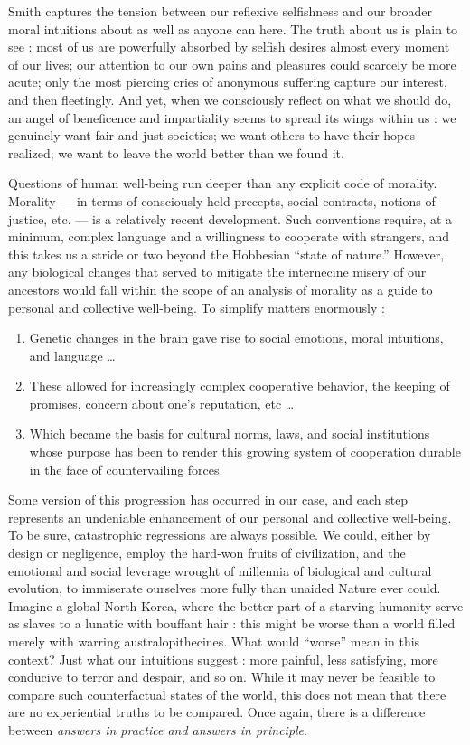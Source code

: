 \documentclass[a4paper,14pt]{extbook}
\begin{document}
Smith captures the tension between our reflexive selfishness and our broader moral intuitions about as well as anyone can here.
The truth about us is plain to see :
most of us are powerfully absorbed by selfish desires almost every moment of our lives;
our attention to our own pains and pleasures could scarcely be more acute;
only the most piercing cries of anonymous suffering capture our interest, and then fleetingly.
And yet, when we consciously reflect on what we should do, an angel of beneficence and impartiality seems to spread its wings within us :
we genuinely want fair and just societies;
we want others to have their hopes realized;
we want to leave the world better than we found it.

Questions of human well-being run deeper than any explicit code of morality.
Morality --- in terms of consciously held precepts, social contracts, notions of justice, etc. --- is a relatively recent development.
Such conventions require, at a minimum, complex language and a willingness to cooperate with strangers, and this takes us a stride or two beyond the Hobbesian ``state of nature.''
However, any biological changes that served to mitigate the internecine misery of our ancestors would fall within the scope of an analysis of morality as a guide to personal and collective well-being.
To simplify matters enormously :

\begin{enumerate}
      \item Genetic changes in the brain gave rise to social emotions, moral intuitions, and language \dots
      \item These allowed for increasingly complex cooperative behavior, the keeping of promises, concern about one's reputation, etc \dots
      \item Which became the basis for cultural norms, laws, and social institutions whose purpose has been to render this growing system of cooperation durable in the face of countervailing forces.
\end{enumerate}

Some version of this progression has occurred in our case, and each step represents an undeniable enhancement of our personal and collective well-being.
To be sure, catastrophic regressions are always possible.
We could, either by design or negligence, employ the hard-won fruits of civilization, and the emotional and social leverage wrought of millennia of biological and cultural evolution, to immiserate ourselves more fully than unaided Nature ever could.
Imagine a global North Korea, where the better part of a starving humanity serve as slaves to a lunatic with bouffant hair :
this might be worse than a world filled merely with warring australopithecines.
What would ``worse'' mean in this context?
Just what our intuitions suggest :
more painful, less satisfying, more conducive to terror and despair, and so on.
While it may never be feasible to compare such counterfactual states of the world, this does not mean that there are no experiential truths to be compared.
Once again, there is a difference between \textit{answers in practice and answers in principle}.
\end{document}

